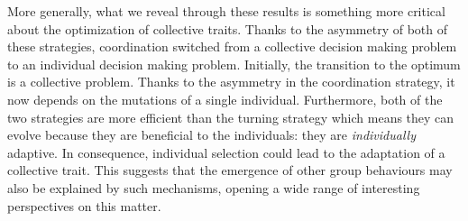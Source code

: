     More generally, what we reveal through these results is something more critical about the optimization of collective traits. Thanks to the asymmetry of both of these strategies, coordination switched from a collective decision making problem to an individual decision making problem. Initially, the transition to the optimum is a collective problem. Thanks to the asymmetry in the coordination strategy, it now depends on the mutations of a single individual. Furthermore, both of the two strategies are more efficient than the turning strategy which means they can evolve because they are beneficial to the individuals: they are \emph{individually} adaptive. In consequence, individual selection could lead to the adaptation of a collective trait. This suggests that the emergence of other group behaviours may also be explained by such mechanisms, opening a wide range of interesting perspectives on this matter.

